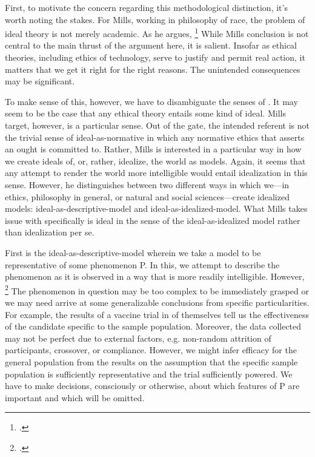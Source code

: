 \documentclass[letterpaper,notitlepage,12pt]{article}
\begin{document}
First, to motivate the concern regarding this methodological distinction, it's
worth noting the stakes.
For Mills, working in philosophy of race, the problem of ideal theory is
not merely academic.
As he argues, \footcite[p. 166]{mills_ideal_2005}
While Mills conclusion is not central to the main thrust of the argument here,
it is salient.
Insofar as ethical theories, including ethics of technology, serve to justify
and permit real action, it matters that we get it right for the right reasons.
The unintended consequences may be significant.

To make sense of this, however, we have to disambiguate the senses of
.
It may seem to be the case that any ethical theory entails some kind of ideal.
Mills target, however, is a particular sense.
Out of the gate, the intended referent is not the trivial sense of
ideal-as-normative in which any normative ethics that asserts an ought is
committed to.
Rather, Mills is interested in a particular way in how we create ideals of, or, 
rather, idealize, the world as models.
Again, it seems that any attempt to render the world more intelligible would
entail idealization in this sense.
However, he distinguishes between two different ways in which we---in ethics, 
philosophy in general, or natural and social sciences---create idealized models:
ideal-as-descriptive-model and ideal-as-idealized-model.
What Mills takes issue with specifically is ideal in the sense of the
ideal-as-idealized model rather than idealization per se.

First is the ideal-as-descriptive-model wherein we take a model to be
representative of some phenomenon P.
In this, we attempt to describe the phenomenon as it is observed in a 
way that is more readily intelligible.
However, \footcite[p. 166]{mills_ideal_2005}
The phenomenon in question may be too complex to be immediately grasped or we
may need arrive at some generalizable conclusions from specific
particularities.
For example, the results of a vaccine trial in of themselves tell us the 
effectiveness of the candidate specific to the sample population.
Moreover, the data collected may not be perfect due to external factors, e.g.
non-random attrition of participants, crossover, or compliance.
However, we might infer efficacy for the general population from the results 
on the assumption that the specific sample population is sufficiently
representative and the trial sufficiently powered.
We have to make decisions, consciously or otherwise, about which 
features of P are important and which will be omitted. 
\end{document}
